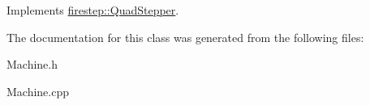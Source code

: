Implements \hyperlink{classfirestep_1_1_quad_stepper}{firestep\+::\+Quad\+Stepper}.



The documentation for this class was generated from the following files\+:\begin{DoxyCompactItemize}
\item 
Machine.\+h\item 
Machine.\+cpp\end{DoxyCompactItemize}
